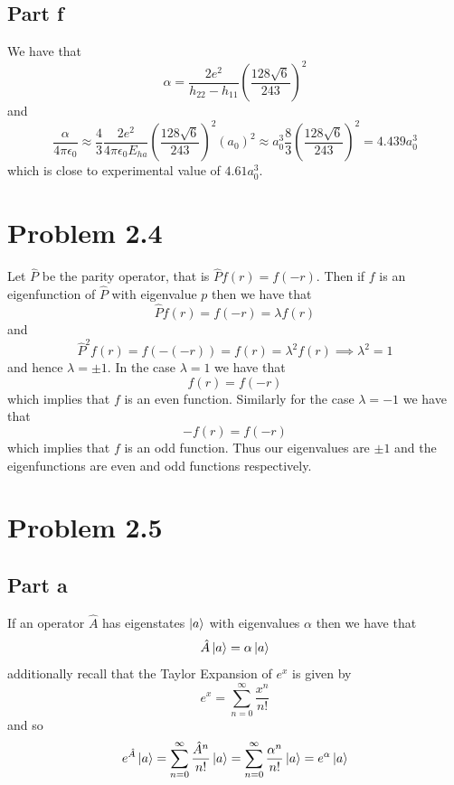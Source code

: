 \documentclass[12pt]{report}
\begin{document}
\subsection*{Part f}
We have that
\begin{equation*}
  \alpha =\frac{2e^2}{h_{22} - h_{11}} \left(\frac{128\sqrt{6}}{243}\right)^2 
\end{equation*}
and 
\begin{equation*}
  \frac{ \alpha}{4\pi \epsilon_0} \approx \frac{4}{3}\frac{2e^2}{4\pi \epsilon_0E_{ha}} \left(\frac{128\sqrt{6}}{243}\right)^2 \left(a_0\right)^2 \approx a_0^3 \frac{8}{3}\left(\frac{128\sqrt{6}}{243}\right)^2 = 4.439 a_0^3 
\end{equation*}
which is close to experimental value of $4.61 a_0^3$.
\section*{Problem 2.4}
Let $\hat{P}$ be the parity operator, that is $\hat{P}f(r) = f(-r)$. Then if $f$ is an eigenfunction of $\hat{P}$ with eigenvalue $p$ then we have that
\begin{equation*}
  \hat{P}f(r) = f(-r) = \lambda f(r)
\end{equation*}
and 
\begin{equation*}
  \hat{P}^2 f(r) = f(-(-r)) = f(r) = \lambda^2 f(r) \implies \lambda^2 = 1
\end{equation*}
and hence $\lambda = \pm 1$. In the case $\lambda =1 $ we have that
\begin{equation*}
  f(r) = f(-r)
\end{equation*}
which implies that $f$ is an even function. Similarly for the case $\lambda = -1$ we have that
\begin{equation*}
  -f(r) = f(-r)
\end{equation*}
which implies that $f$ is an odd function. Thus our eigenvalues are $\pm 1$ and the eigenfunctions are even and odd functions respectively. 

\section*{Problem 2.5}
\subsection*{Part a}
If an operator $\hat{A}$ has eigenstates $\ket{a}$ with eigenvalues $\alpha$ then we have that 
\begin{equation*}
  \hat{A}\ket{a} = \alpha \ket{a}
\end{equation*}
additionally recall that the Taylor Expansion of $e^x$ is given by
\begin{equation*}
  e^x = \sum_{n=0}^\infty \frac{x^n}{n!}
\end{equation*}
and so 
\begin{equation*}
  e^{\hat{A}}\ket{a} = \sum_{n=0}^\infty \frac{\hat{A}^n}{n!}\ket{a} = \sum_{n=0}^\infty \frac{\alpha^n}{n!}\ket{a} = e^\alpha \ket{a}
\end{equation*}
\end{document}
